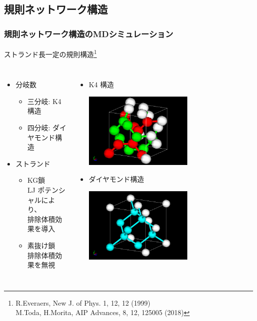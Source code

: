 \documentclass[12pt, dvipdfmx]{beamer}
\begin{document}
\subsection{規則ネットワーク構造}
\begin{frame}
	\frametitle{規則ネットワーク構造のMDシミュレーション}
	ストランド長一定の規則構造\footnote{
		R.Everaers, New J. of Phys. 1, 12, 12 (1999)\\
		M.Toda, H.Morita, AIP Advances, 8, 12, 125005 (2018)
			}
	\begin{columns}[totalwidth=\textwidth]
			\begin{itemize}
				\item 分岐数 
					\begin{itemize}
						\item 三分岐: K4 構造
						\item 四分岐: ダイヤモンド構造
					\end{itemize}
				\item ストランド
					\begin{itemize}
						\item KG鎖\\LJ ポテンシャルにより、\\ \alert{排除体積効果}を導入
						\item 素抜け鎖\\{\color{blue}排除体積効果を無視}
					\end{itemize}
			\end{itemize}
			\small
			\begin{itemize}
				\item K4 構造

				\includegraphics[width=0.6\textwidth]{K4_d.png}

				\item ダイヤモンド構造

				\includegraphics[width=0.6\textwidth]{dia.png}


\end{itemize}
\end{columns}
\end{frame}
\end{document}
